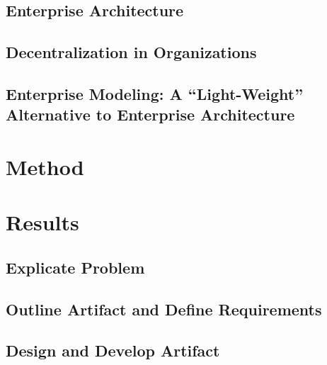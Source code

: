 \documentclass[12pt, a4, oneside, openright]{book}
\begin{document}
    \section{Enterprise Architecture}
    \label{sec:ea}
    
    
    \section{Decentralization in Organizations}
    \label{sec:organizations}
       
    
    \section{Enterprise Modeling: A ``Light-Weight'' Alternative to Enterprise Architecture}
    \label{sec:related}
    
    
    
    \chapter{Method}
    \label{chap:method}
    
    
    
    \chapter{Results}
    \label{chap:results}  
    
    
    \section{Explicate Problem}    
    \label{sec:exproblem}
    
    
    \section{Outline Artifact and Define Requirements}
    \label{sec:outline}
        
    
    \section{Design and Develop Artifact}
    \label{sec:design}
    
    
\end{document}
